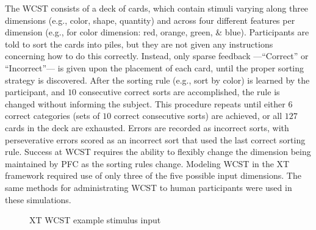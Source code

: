 \documentclass[man]{apa}
\begin{document}
The WCST consists of a deck of cards, which contain stimuli varying along three dimensions (e.g., color, shape, quantity) and across four different features per dimension (e.g., for color dimension: red, orange, green, \& blue).  Participants are told to sort the cards into piles, but they are not given any instructions concerning how to do this correctly.  Instead, only sparse feedback ---``Correct'' or ``Incorrect''--- is given upon the placement of each card, until the proper sorting strategy is discovered.  After the sorting rule (e.g., sort by color) is learned by the participant, and $10$ consecutive correct sorts are accomplished, the rule is changed without informing the subject.  This procedure repeats until either $6$ correct categories (sets of $10$ correct consecutive sorts) are achieved, or all $127$ cards in the deck are exhausted.  Errors are recorded as incorrect sorts, with perseverative errors scored as an incorrect sort that used the last correct sorting rule.  Success at WCST requires the ability to flexibly change the dimension being maintained by PFC as the sorting rules change.  Modeling WCST in the XT framework required use of only three of the five possible input dimensions.  The same methods for administrating WCST to human participants were used in these simulations.

\begin{figure}
  \begin{center}
  \end{center}
  \caption{XT WCST example stimulus input}
  \label{xt_wcst_stim}
\end{figure}
\end{document}
